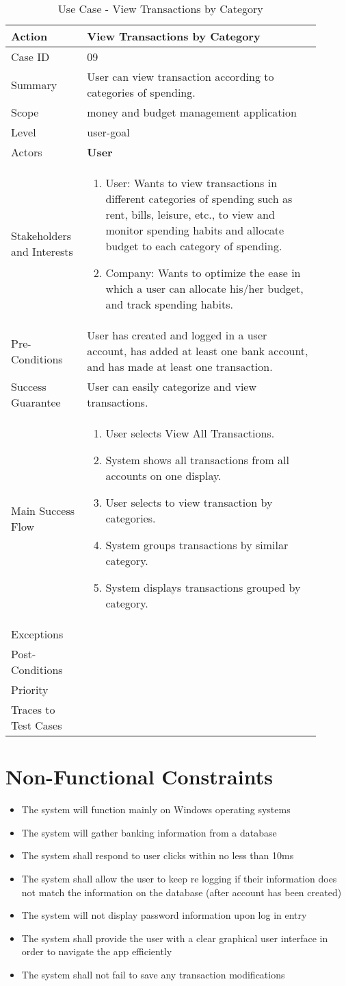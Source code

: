 \documentclass[11pt]{article}
\newcounter{use case ID}
\newcommand\tabularhead[1]{
\begin{table}[ht]
    \addtocounter{use case ID}{1}
    \caption{Use Case \arabic{use case ID} - #1}
    \vspace{0.2cm}
    \begin{tabular}{|p{0.2\linewidth}|p{0.70\linewidth}|}
    \hline
        \textbf{Action} & \textbf{#1} \\
        \hline}
\newcommand\addrow[2]{#1 & #2\\ \hline}
\newcommand\addmulrow[2]{ \begin{minipage}[t][][t]{2.5cm}#1\end{minipage}
        &\begin{minipage}[t][][t]{11cm}
        \begin{enumerate}[itemsep=-1ex] #2   \end{enumerate}
    \end{minipage}\vfill\\ \hline}
\newenvironment{usecase}{\tabularhead}
{\hline\end{tabular}\end{table}}
\begin{document}
\begin{usecase}{View Transactions by Category}
    \addrow{Case ID}{09}
    \addrow{Summary}{User can view transaction according to categories of spending.}
    \addrow{Scope}{money and budget management application}
    \addrow{Level}{user-goal}
    \addrow{Actors}{\textbf{User}}
    \addmulrow{Stakeholders and Interests}{
        \item User: Wants to view transactions in different categories of spending such as rent, bills, leisure, etc., to view and monitor spending habits and allocate budget to each category of spending.
        \item Company: Wants to optimize the ease in which a user can allocate his/her budget, and track spending habits.}
    \addrow{Pre-Conditions}{User has created and logged in a user account, has added at least one bank account, and has made at least one transaction.}
    \addrow{Success Guarantee}{User can easily categorize and view transactions.}
    \addmulrow{Main Success Flow}{
        \item User selects View All Transactions.
        \item System shows all transactions from all accounts on one display.
       \item User selects to view transaction by categories.
        \item System groups transactions by similar category.
        \item System displays transactions grouped by category.}
    \addrow{Exceptions}{}
    \addrow{Post-Conditions}{}
    \addrow{Priority}{}
    \addrow{Traces to Test Cases}{}
\end{usecase}


\section{Non-Functional Constraints}

\begin{itemize}
    \item The system will function mainly on Windows operating systems
    \item The system will gather banking information from a database
    \item The system shall respond to user clicks within no less than 10ms
    \item The system shall allow the user to keep re logging if their information does not match the information on the database (after account has been created)
    \item The system will not display password information upon log in entry
    \item The system shall provide the user with a clear graphical user interface in order to navigate the app efficiently 
    \item The system shall not fail to save any transaction modifications
    
\end{itemize}
\end{document}
